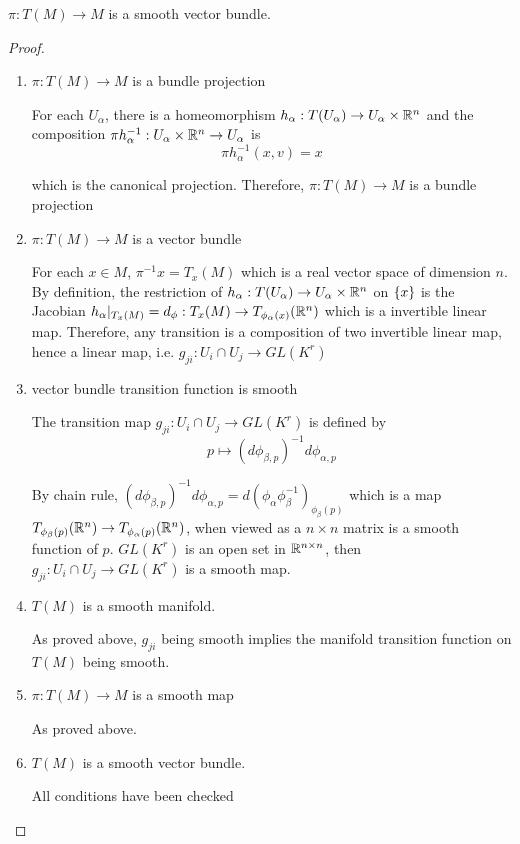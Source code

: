 \begin{proposition}
	$\pi: T(M) \to M$ is a smooth vector bundle.
	\begin{proof}
		\begin{enumerate}
			\item $\pi: T(M) \to M$ is a bundle projection
			
			For each $U_\alpha$, there is a homeomorphism $h_\alpha: T(U_\alpha) \to U_\alpha \times \mathbb{R}^n$ and the composition $\pi h_\alpha^{-1}: U_\alpha \times \mathbb{R}^n \to U_\alpha$ is
			$$
			\pi h_\alpha^{-1}(x, v) = x
			$$
			
			which is the canonical projection. Therefore, $\pi: T(M) \to M$ is a bundle projection
			
			\item $\pi: T(M) \to M$ is a vector bundle
			
			For each $x \in M$, $\pi^{-1} x = T_x(M)$ which is a real vector space of dimension $n$. By definition, the restriction of $h_\alpha: T(U_\alpha) \to U_\alpha \times \mathbb{R}^n$ on $\{x\}$ is the Jacobian $h_\alpha \vert_{T_x(M)} = d_\phi: T_x(M) \to T_{\phi_\alpha(x)}(\mathbb{R}^n)$ which is a invertible linear map. Therefore, any transition is a composition of two invertible linear map, hence a linear map, i.e. $g_{ji}: U_i \cap U_j \to GL(K^r)$
			
			\item vector bundle transition function is smooth
			
			The transition map $g_{ji}: U_i \cap U_j \to GL(K^r)$ is defined by
			$$
			p \mapsto (d\phi_{\beta, p})^{-1} d\phi_{\alpha, p} 
			$$
			
			By chain rule, $(d\phi_{\beta, p})^{-1} d\phi_{\alpha, p} = d(\phi_\alpha \phi_\beta^{-1})_{\phi_\beta(p)}$ which is a map $T_{\phi_\beta(p)}(\mathbb{R}^n) \to T_{\phi_\alpha(p)}(\mathbb{R}^n)$, when viewed as a $n \times n$ matrix is a smooth function of $p$. $GL(K^r)$ is an open set in $\mathbb{R}^{n \times n}$, then $g_{ji}: U_i \cap U_j \to GL(K^r)$ is a smooth map.
			
			\item $T(M)$ is a smooth manifold.
			
			As proved above, $g_{ji}$ being smooth implies the manifold transition function on $T(M)$ being smooth.
			
			\item $\pi: T(M) \to M$ is a smooth map
			
			As proved above.
			
			\item $T(M)$ is a smooth vector bundle.
			
			All conditions have been checked
			
		\end{enumerate}
	\end{proof}
\end{proposition}

